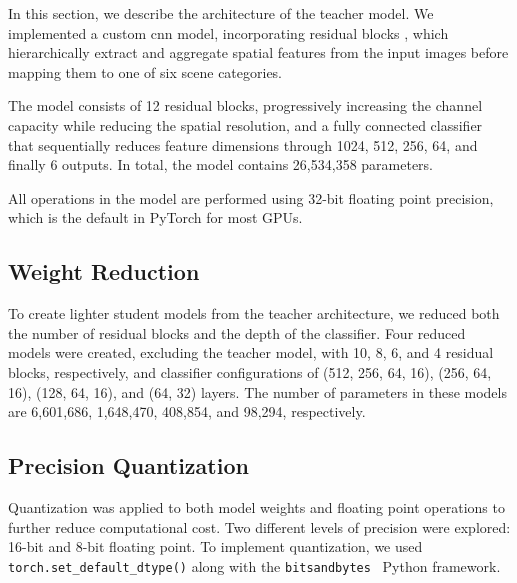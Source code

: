 In this section, we describe the architecture of the teacher model.
We implemented a custom \gls*{cnn} model, incorporating residual blocks \cite{he2016deep},
which hierarchically extract and aggregate spatial features from the input images
before mapping them to one of six scene categories.

The model consists of 12 residual blocks,
progressively increasing the channel capacity while reducing the spatial resolution,
and a fully connected classifier that sequentially reduces feature dimensions through 1024, 512, 256, 64, and finally 6 outputs.
In total, the model contains 26,534,358 parameters.

All operations in the model are performed using 32-bit floating point precision,
which is the default in PyTorch \cite{paszke2019pytorch}
for most GPUs.

\subsection{Weight Reduction}
\label{sec:method:weight_reduction}

To create lighter student models from the teacher architecture,
we reduced both the number of residual blocks and the depth of the classifier.
Four reduced models were created, excluding the teacher model,
with 10, 8, 6, and 4 residual blocks, respectively,
and classifier configurations of (512, 256, 64, 16), (256, 64, 16), (128, 64, 16), and (64, 32) layers.
The number of parameters in these models are 6,601,686, 1,648,470, 408,854, and 98,294, respectively.

\subsection{Precision Quantization}
\label{sec:method:precision_quantization}

Quantization was applied to both model weights and floating point operations
to further reduce computational cost.
Two different levels of precision were explored: 16-bit and 8-bit floating point.
To implement quantization,
we used \texttt{torch.set\_default\_dtype()} along with the \texttt{bitsandbytes}~\cite{bitsandbytes} Python framework.
